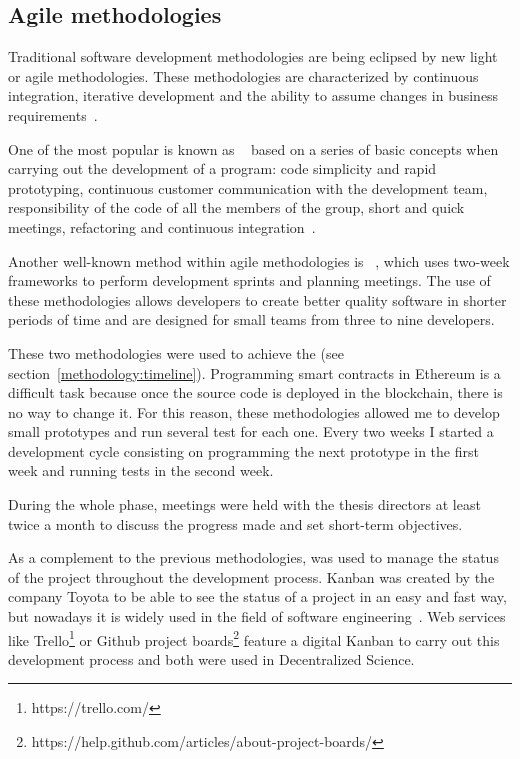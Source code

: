 \subsection{Agile methodologies}
\label{sec:agile-methodologies}

Traditional software development methodologies are being eclipsed by new light
or agile methodologies. These methodologies are characterized by continuous
integration, iterative development and the ability to assume changes in business
requirements~\cite{boehm2005management,livermore2008factors}.

One of the most popular is known as ~\cite{lindstrom2004extreme} based on a series of basic concepts
when carrying out the development of a program: code simplicity and rapid
prototyping, continuous customer communication with the development team,
responsibility of the code of all the members of the group, short and quick
meetings, refactoring and continuous integration~\cite{theunissen2005search}.

Another well-known method within agile methodologies is
~\cite{rising2000scrum}, which uses two-week frameworks to perform
development sprints and planning meetings. The use of these methodologies allows
developers to create better quality software in shorter periods of time and are
designed for small teams from three to nine developers.

These two methodologies were used to achieve the 
(see section~\ref{methodology:timeline}). Programming smart contracts in
Ethereum is a difficult task because once the source code is deployed in the
blockchain, there is no way to change it. For this reason, these methodologies
allowed me to develop small prototypes and run several test for each one. Every
two weeks I started a development cycle consisting on programming the next
prototype in the first week and running tests in the second week.

During the whole  phase, meetings were held with the
thesis directors at least twice a month to discuss the progress made and set
short-term objectives.

As a complement to the previous methodologies,  was used to manage
the status of the project throughout the development process. Kanban was created
by the company Toyota to be able to see the status of a project in an easy and
fast way, but nowadays it is widely used in the field of software
engineering~\cite{ahmad2013kanban}. Web services like
Trello\footnote{https://trello.com/} or Github project
boards\footnote{https://help.github.com/articles/about-project-boards/} feature
a digital Kanban to carry out this development process and both were used in
Decentralized Science.

